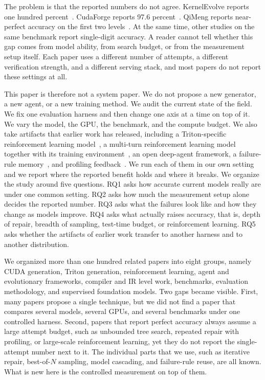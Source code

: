 \documentclass[11pt]{article}
\begin{document}
The problem is that the reported numbers do not agree. KernelEvolve reports one hundred
percent~\citep{liao2026kernelevolve}. CudaForge reports 97.6 percent~\citep{cudaforge2025}. QiMeng
reports near-perfect accuracy on the first two levels~\citep{qimengkernel2026}. At the same time,
other studies on the same benchmark report single-digit accuracy. A reader cannot tell whether
this gap comes from model ability, from search budget, or from the measurement setup itself.
Each paper uses a different number of attempts, a different verification strength, and a
different serving stack, and most papers do not report these settings at all.

This paper is therefore not a system paper. We do not propose a new generator, a new agent,
or a new training method. We audit the current state of the field. We fix one evaluation
harness and then change one axis at a time on top of it. We vary the model, the GPU, the
benchmark, and the compute budget. We also take artifacts that earlier work has released,
including a Triton-specific reinforcement learning model~\citep{li2025autotriton}, a multi-turn
reinforcement learning model together with its training environment~\citep{drkernel2026}, an open
deep-agent framework, a failure-rule memory~\citep{du2026adaexplore}, and profiling
feedback~\citep{cudaforge2025}. We run each of them in our own setting and we report where the
reported benefit holds and where it breaks. We organize the study around five questions.
RQ1 asks how accurate current models really are under one common setting. RQ2 asks how much
the measurement setup alone decides the reported number. RQ3 asks what the failures look like
and how they change as models improve. RQ4 asks what actually raises accuracy, that is, depth
of repair, breadth of sampling, test-time budget, or reinforcement learning. RQ5 asks whether
the artifacts of earlier work transfer to another harness and to another distribution.

We organized more than one hundred related papers into eight groups, namely CUDA generation,
Triton generation, reinforcement learning, agent and evolutionary frameworks, compiler and IR
level work, benchmarks, evaluation methodology, and supervised foundation models. Two gaps
became visible. First, many papers propose a single technique, but we did not find a paper that
compares several models, several GPUs, and several benchmarks under one controlled harness.
Second, papers that report perfect accuracy always assume a large attempt budget, such as
unbounded tree search, repeated repair with profiling, or large-scale reinforcement learning,
yet they do not report the single-attempt number next to it. The individual parts that we use,
such as iterative repair, best-of-$N$ sampling, model cascading, and failure-rule reuse, are all
known. What is new here is the controlled measurement on top of them.
\end{document}
